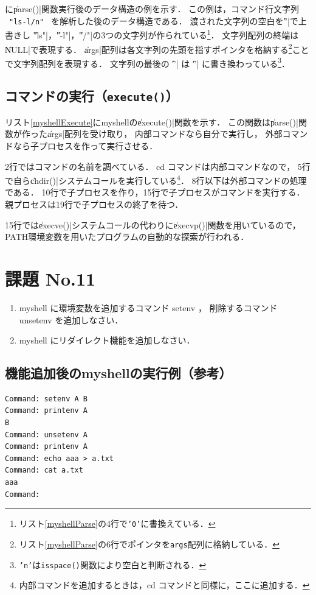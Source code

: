 に\|parse()|関数実行後のデータ構造の例を示す．
この例は，コマンド行文字列
~\texttt{"ls{\textvisiblespace}-l{\textvisiblespace}{\textvisiblespace}/{\bs}n"}~
を解析した後のデータ構造である．
渡された文字列の空白を\|'\0'|で上書きし
\|"ls"|，\|"-l"|，\|"/"|の3つの文字列が作られている\footnote{
  リスト\ref{myshellParse}の4行で\texttt{'{\bs}0'}に書換えている．}．
文字列配列の終端は\|NULL|で表現する．
\|args|配列は各文字列の先頭を指すポインタを格納する\footnote{
  リスト\ref{myshellParse}の6行でポインタを\texttt{args}配列に格納している．
}ことで文字列配列を表現する．
文字列の最後の \|'\n'| は \|'\0'| に書き換わっている\footnote{
  \texttt{'{\bs}n'}は\texttt{isspace()}関数により空白と判断される．
}．

\subsection{コマンドの実行（\texttt{execute()}）}
リスト\ref{myshellExecute}にmyshellの\|execute()|関数を示す．
この関数は\|parse()|関数が作った\|args|配列を受け取り，
内部コマンドなら自分で実行し，
外部コマンドなら子プロセスを作って実行させる．



2行ではコマンドの名前を調べている．
cd コマンドは内部コマンドなので，
5行で自ら\|chdir()|システムコールを実行している\footnote{
  内部コマンドを追加するときは，cd コマンドと同様に，ここに追加する．}．
8行以下は外部コマンドの処理である．
10行で子プロセスを作り，15行で子プロセスがコマンドを実行する．
親プロセスは19行で子プロセスの終了を待つ．

15行では\|execve()|システムコールの代わりに\|execvp()|関数を用いているので，
PATH環境変数を用いたプログラムの自動的な探索が行われる．

\newpage
\section*{課題 No.11}

\begin{enumerate}
\item myshell に環境変数を追加するコマンド setenv ，
  削除するコマンド unsetenv を追加しなさい．
\item myshell にリダイレクト機能を追加しなさい．
\end{enumerate}

\subsection*{機能追加後のmyshellの実行例（参考）}
\begin{lstlisting}[numbers=none]
Command: setenv A B
Command: printenv A
B
Command: unsetenv A
Command: printenv A
Command: echo aaa > a.txt
Command: cat a.txt
aaa
Command:
\end{lstlisting}
